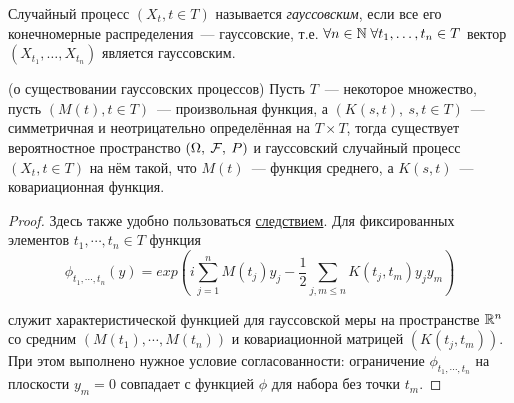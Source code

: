 \begin{definition} Случайный процесс $(X_t, t \in T)$ называется \textit{гауссовским}, если все его конечномерные распределения~---     гауссовские, т.е. $\forall n \in \mathbb{N} \; \forall t_1, \ldots, t_n \in T$ вектор $(X_{t_1}, \ldots, X_{t_n})$ является гауссовским.
\end{definition}

\begin{theorem}(о существовании гауссовских процессов)
    Пусть $T$~--- некоторое множество, пусть $(M(t), t \in T)$~--- произвольная функция, а $(K(s, t), \ s, t \in T)$~--- симметричная и неотрицательно определённая на $T\times T$, тогда существует вероятностное пространство $(\Omega,\: \mathcal{F},\: P)$ и гауссовский случайный процесс $(X_t, t \in T)$ на нём такой, что $M(t)$~--- функция среднего, а $K(s, t)$~--- ковариационная функция.
\end{theorem}

\begin{proof}
    Здесь также удобно пользоваться \hyperref[3.6.1]{следствием}. Для фиксированных элементов $t_1, \cdots, t_n \in T$ функция
    $$\phi_{t_1, \cdots, t_n}(y) = exp(i \sum\limits_{j=1}^{n} M(t_j) y_j - \frac{1}{2} \sum\limits_{j, m \leq n} K(t_j, t_m) y_j y_m)$$

    служит характеристической функцией для гауссовской меры на пространстве $\mathbb{R}^n$ со средним $(M(t_1), \cdots, M(t_n))$ и ковариационной матрицей $(K(t_j, t_m))$. При этом выполнено нужное условие согласованности: ограничение $\phi_{t_1, \cdots, t_n}$ на плоскости $y_m = 0$ совпадает с функцией $\phi$ для набора без точки $t_m$.
\end{proof}
